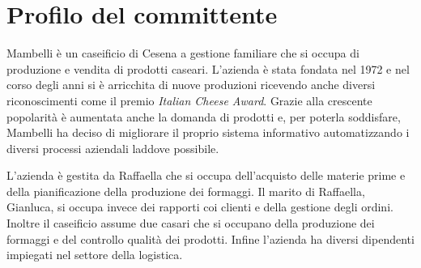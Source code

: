 \section{Profilo del committente}\label{sec:profilo-del-committente}
Mambelli è un caseificio di Cesena a gestione familiare che si occupa di produzione e vendita di prodotti caseari. L'azienda è stata fondata nel 1972 e nel corso degli anni si è arricchita di nuove produzioni ricevendo anche diversi riconoscimenti come il premio \emph{Italian Cheese Award}. 
Grazie alla crescente popolarità è aumentata anche la domanda di prodotti e, per poterla soddisfare, Mambelli ha deciso di migliorare il proprio sistema informativo automatizzando i diversi processi aziendali laddove possibile.

L'azienda è gestita da Raffaella che si occupa dell'acquisto delle materie prime e della pianificazione della produzione dei formaggi. Il marito di Raffaella, Gianluca, si occupa invece dei rapporti coi clienti e della gestione degli ordini. Inoltre il caseificio assume due casari che si occupano della produzione dei formaggi e del controllo qualità dei prodotti. Infine l'azienda ha diversi dipendenti impiegati nel settore della logistica.

